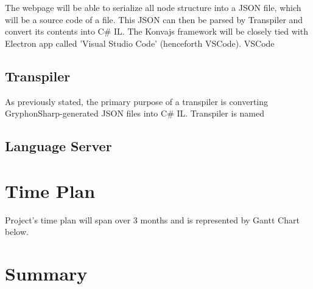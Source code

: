 \documentclass{report}
\begin{document}
The webpage will be able to serialize all node structure into a JSON file, which will be a source code of a file. This JSON can then be parsed by Transpiler and convert its contents into C\# IL.
The Konvajs framework will be closely tied with Electron app called 'Visual Studio Code' (henceforth VSCode). VSCode 
\subsection*{Transpiler}
As previously stated, the primary purpose of a transpiler is converting GryphonSharp-generated JSON files into C\# IL. Transpiler is named 
\subsection*{Language Server}


\section{Time Plan}
Project's time plan will span over 3 months and is represented by Gantt Chart below.

\section{Summary}




\end{document}
